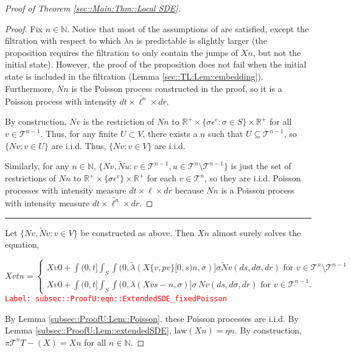 \documentclass[12pt]{article}
\newcommand{\mb}{\mathbb}
\newcommand{\mc}{\mathcal}
\newcommand{\ov}{\overline}
\newcommand{\te}{\text}
\newcommand{\ep}{\epsilon}
\newcommand{\tr}{\textcolor{red}}
\newcommand{\labe}[1]{\tr{\texttt{Label: #1}}}
\newcommand{\ind}{\hspace{24pt}}
\newcommand{\lin}{\rule{\linewidth}{0.4 pt}}
\renewcommand{\v}{v}							%
\newcommand{\vv}{u}								%
\renewcommand{\U}{U}							%
\renewcommand{\S}{S}							%
\newcommand{\s}{\sigma}							%
\newcommand{\ev}{\ep}							%
\newcommand{\T}{T}								%
\renewcommand{\t}{t}							%
\newcommand{\proj}{\pi}							%
\renewcommand{\tt}{s}							%
\newcommand{\X}{X}								%
\newcommand{\vind}[1]{^{#1}}					%
\newcommand{\cl}{\ov}							%
\newcommand{\tree}{\mc{T}}						%
\newcommand{\sln}[1]{^{#1}}						%
\newcommand{\poiss}{N}							%
\newcommand{\Sm}{\ell}							%
\newcommand{\rate}{\lambda}						%
\renewcommand{\r}{r}							%
\newcommand{\alt}[1]{\widetilde{#1}}			%
\newcommand{\mmm}{\eta}							%
\newcommand{\crate}{\alt{\lambda}}				%
\newcommand{\p}{p}								%
\begin{document}
\begin{proof}[Proof of Theorem \ref{sec::Main:Thm::Local SDE}]
\begin{proof}
Fix \(n \in \mb{N}\). Notice that most of the assumptions of \cite[Proposition 14.7.I(b)]{DalVer08} are satisfied, except the filtration with respect to which \(\rate{n}\) is predictable is slightly larger (the proposition requires the filtration to only contain the jumps of \(\X{}{}{n}\), but not the initial state). However, the proof of the proposition does not fail when the initial state is included in the filtration (Lemma \ref{sec::TL:Lem::embedding}). Furthermore, \(\poiss{n}\) is the Poisson process constructed in the proof, so it is a Poisson process with intensity \(d\t\times \alt{\Sm^n}\times d\r\).

\ind By construction, \(\poiss{\v}\) is the restriction of \(\poiss{n}\) to \(\mb{R}^+ \times \{\s\ev\vind{\v}: \s\in \S\}\times \mb{R}^+\) for all \(\v\in \tree\sln{n-1}\). Thus, for any finite \(\U \subset V\), there exists a \(n\) such that \(\U \subseteq \tree\sln{n-1}\), so \(\{\poiss{\v}: \v\in \U\}\) are i.i.d. Thus, \(\{\poiss{\v}: \v\in V\}\) are i.i.d.

\ind Similarly, for any \(n \in \mb{N}\), \(\{\poiss{\v},\alt{\poiss}{\vv}: \v \in \tree\sln{n-1},\vv\in\tree\sln{n}\setminus\tree\sln{n-1}\}\) is just the set of restrictions of \(\poiss{n}\) to \(\mb{R}^+\times\{\s\ev\vind{\v}\}\times\mb{R}^+\) for each \(\v\in \tree\sln{n}\), so they are i.i.d. Poisson processes with intensity measure \(d\t\times \Sm\times d\r\) because \(\poiss{n}\) is a Poisson process with intensity measure \(d\t\times\alt{\Sm^n}\times d\r\).
\end{proof}

\lin

Let \(\{\poiss{\v},\alt{\poiss}{\v}:\v\in V\}\) be constructed as above. Then \(\X{}{}{n}\) almost surely solves the equation,

\begin{equation}
\X{\v}{\t}{n} = \begin{cases}
\X{\v}{0}{} + \int{(0,\t]}\int_\S\int{(0,\crate{}{}(\X{\{\v,\p{\v}\}}{[0,\tt)}{n},\s)]}\s\alt{\poiss}{\v}(d\tt,d\s,d\r)\te{ for } \v \in \tree\sln{n}\setminus\tree\sln{n-1}\\
\X{\v}{0}{} + \int{(0,\t]}\int_\S\int{(0,\rate{}(\X{\cl{\v}}{\tt-}{n},\s)]}\s\,\poiss{\v}(d\tt,d\s,d\r)\te{ for } \v \in \tree\sln{n-1}.
\end{cases}
\label{subsec::ProofU:eqn::ExtendedSDE_fixedPoisson}
\end{equation}
\labe{subsec::ProofU:eqn::ExtendedSDE\_fixedPoisson}

By Lemma \ref{subsec::ProofU:Lem::Poisson}, these Poisson processes are i.i.d. By Lemma \ref{subsec::ProofU:Lem::extendedSDE}, \(\te{law}(\X{}{}{n}) = \mmm{}{}{n}\). By construction, \(\proj{\tree\sln{n}}{\T-}(\X{}{}) = \X{}{}{n}\) for all \(n\in\mb{N}\).


\end{proof}
\end{document}
